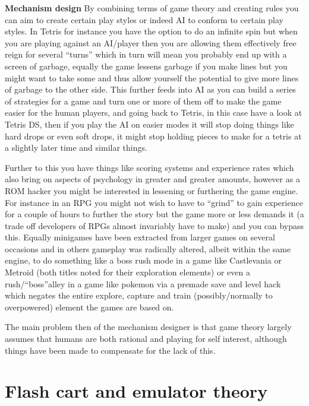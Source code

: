 \documentclass[
]{book}
\begin{document}
\textbf{Mechanism design} By combining terms of game theory and creating rules you can aim to create certain play styles or indeed AI to conform to certain play styles. In Tetris for instance you have the option to do an infinite spin but when you are playing against an AI/player then you are allowing them effectively free reign for several ``turns'' which in turn will mean you probably end up with a screen of garbage, equally the game lessens garbage if you make lines but you might want to take some and thus allow yourself the potential to give more lines of garbage to the other side. This further feeds into AI as you can build a series of strategies for a game and turn one or more of them off to make the game easier for the human players, and going back to Tetris, in this case have a look at Tetris DS, then if you play the AI on easier modes it will stop doing things like hard drops or even soft drops, it might stop holding pieces to make for a tetris at a slightly later time and similar things.

Further to this you have things like scoring systems and experience rates which also bring on aspects of psychology in greater and greater amounts, however as a ROM hacker you might be interested in lessening or furthering the game engine. For instance in an RPG you might not wish to have to ``grind'' to gain experience for a couple of hours to further the story but the game more or less demands it (a trade off developers of RPGs almost invariably have to make) and you can bypass this. Equally minigames have been extracted from larger games on several occasions and in others gameplay was radically altered, albeit within the same engine, to do something like a boss rush mode in a game like Castlevania or Metroid (both titles noted for their exploration elements) or even a rush/``boss''alley in a game like pokemon via a premade save and level hack which negates the entire explore, capture and train (possibly/normally to overpowered) element the games are based on.

The main problem then of the mechanism designer is that game theory largely assumes that humans are both rational and playing for self interest, although things have been made to compensate for the lack of this.

\hypertarget{flash-cart-and-emulator-theory}{%
\section{Flash cart and emulator theory}\label{flash-cart-and-emulator-theory}}
\end{document}
